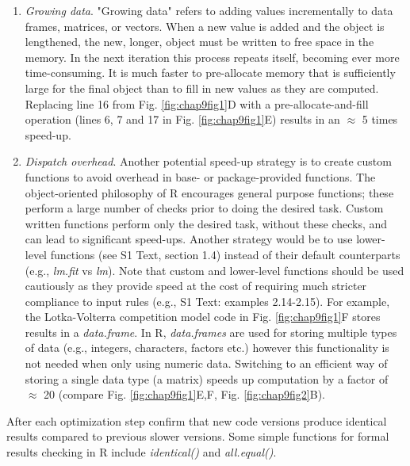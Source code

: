 \documentclass[b5paper,justified]{tufte-book} %
\begin{document}
\begin{fullwidth}
\begin{enumerate}
\item \textit{Growing data}.
"Growing data" refers to adding values incrementally to data frames, matrices, or vectors. When a new value is added and the object is lengthened, the new, longer, object must be written to free space in the memory. In the next iteration this process repeats itself, becoming ever more time-consuming. It is much faster to pre-allocate memory that is sufficiently large for the final object than to fill in new values as they are computed. Replacing line 16 from Fig. \ref{fig:chap9fig1}D with a pre-allocate-and-fill operation (lines 6, 7 and 17 in Fig. \ref{fig:chap9fig1}E) results in an $\approx$ 5 times speed-up. 

\item \textit{Dispatch overhead}.
Another potential speed-up strategy is to create custom functions to avoid overhead in base- or package-provided functions. The object-oriented philosophy of R encourages general purpose functions; these perform a large number of checks prior to doing the desired task. Custom written functions perform only the desired task, without these checks, and can lead to significant speed-ups. Another strategy would be to use lower-level functions (see S1 Text, section
1.4) instead of their default counterparts (e.g., \emph{lm.fit} vs \emph{lm}). Note that custom and lower-level functions should be used cautiously as they provide speed at the cost of requiring much stricter compliance to input rules (e.g., S1 Text: examples 2.14-2.15). For example, the Lotka-Volterra competition model code in Fig. \ref{fig:chap9fig1}F stores results in a \textit{data.frame}. In R, \textit{data.frames} are used for storing multiple types of data (e.g., integers, characters, factors etc.) however this functionality is not needed when only using numeric data. Switching to an efficient way of storing a single data type (a matrix) speeds up computation by a factor of $\approx$ 20 (compare Fig. \ref{fig:chap9fig1}E,F, Fig. \ref{fig:chap9fig2}B).
\end{enumerate}

After each optimization step confirm that new code versions produce identical results compared to previous slower versions. Some simple functions for formal results checking in R include \emph{identical()} and \emph{all.equal()}.



\end{fullwidth}
\end{document}
